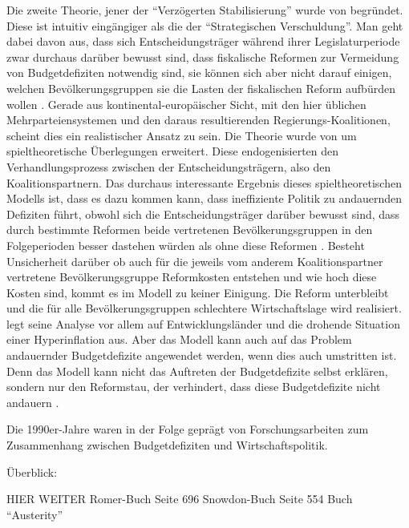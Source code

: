 Die zweite Theorie, jener der "`Verzögerten Stabilisierung"' wurde von \textcite{Alesina1991} begründet. Diese ist intuitiv eingängiger als die der "`Strategischen Verschuldung"'. Man geht dabei davon aus, dass sich Entscheidungsträger während ihrer Legislaturperiode zwar durchaus darüber bewusst sind, dass fiskalische Reformen zur Vermeidung von Budgetdefiziten notwendig sind, sie können sich aber nicht darauf einigen, welchen Bevölkerungsgruppen sie die Lasten der fiskalischen Reform aufbürden wollen \parencite[S. 691]{Romer2019}. Gerade aus kontinental-europäischer Sicht, mit den hier üblichen Mehrparteiensystemen und den daraus resultierenden Regierungs-Koalitionen, scheint dies ein realistischer Ansatz zu sein. Die Theorie wurde von \textcite{Hsieh2000} um spieltheoretische Überlegungen erweitert. Diese endogenisierten den Verhandlungsprozess zwischen der Entscheidungsträgern, also den Koalitionspartnern. Das durchaus interessante Ergebnis dieses spieltheoretischen Modells ist, dass es dazu kommen kann, dass ineffiziente Politik zu andauernden Defiziten führt, obwohl sich die Entscheidungsträger darüber bewusst sind, dass durch bestimmte Reformen beide vertretenen Bevölkerungsgruppen in den Folgeperioden besser dastehen würden als ohne diese Reformen \parencite[S. 164]{Hsieh2000}. Besteht Unsicherheit darüber ob auch für die jeweils vom anderem Koalitionspartner vertretene Bevölkerungsgruppe Reformkosten entstehen und wie hoch diese Kosten sind, kommt es im Modell zu keiner Einigung. Die Reform unterbleibt und die für alle Bevölkerungsgruppen schlechtere Wirtschaftslage wird realisiert. \textcite{Hsieh2000} legt seine Analyse vor allem auf Entwicklungsländer und die drohende Situation einer Hyperinflation aus. Aber das Modell kann auch auf das Problem andauernder Budgetdefizite angewendet werden, wenn dies auch umstritten ist. Denn das Modell kann nicht das Auftreten der Budgetdefizite selbst erklären, sondern nur den Reformstau, der verhindert, dass diese Budgetdefizite nicht andauern \parencite[S. 695]{Romer2019}.

Die 1990er-Jahre waren in der Folge geprägt von Forschungsarbeiten zum Zusammenhang zwischen Budgetdefiziten und Wirtschaftspolitik.


Überblick: \textcite{Perotti1995b}
\textcite{Roubini1989}
\textcite{Persson2004}
\textcite{Perotti1995}
\textcite{Perotti1996}
\textcite{Perotti1997}
\textcite{Alesina2000}

\textcite{Alesina2019}


HIER WEITER
Romer-Buch Seite 696
Snowdon-Buch Seite 554
Buch "`Austerity"'



